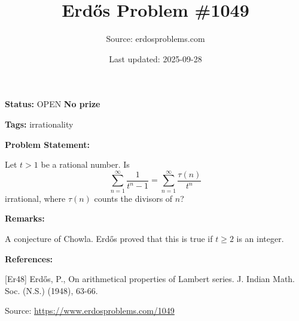\documentclass{article}
\title{Erd\H{o}s Problem \#1049}
\date{Last updated: 2025-09-28}
\author{Source: erdosproblems.com}
\begin{document}
\maketitle

\noindent\textbf{Status:} OPEN \quad \textbf{No prize}

\noindent\textbf{Tags:} irrationality

\medskip
\noindent\textbf{Problem Statement:}

Let $t>1$ be a rational number. Is\[\sum_{n=1}^\infty\frac{1}{t^n-1}=\sum_{n=1}^\infty \frac{\tau(n)}{t^n}\]irrational, where $\tau(n)$ counts the divisors of $n$?

\bigskip
\noindent\textbf{Remarks:}

A conjecture of Chowla. Erd\H{o}s \cite{Er48} proved that this is true if $t\geq 2$ is an integer.

\bigskip
\noindent\textbf{References:}

[Er48] Erd\H{o}s, P., On arithmetical properties of Lambert series. J. Indian Math. Soc. (N.S.) (1948), 63-66.

\bigskip
\noindent\small{Source: \url{https://www.erdosproblems.com/1049}}
\end{document}
